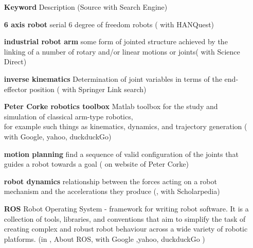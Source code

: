 \begin{itemize} [wide=\parindent]  %
	\item[\textbf{Keyword}] Description (Source with Search Engine)
	\item [\textbf{6 axis robot}] serial 6 degree of freedom robots (\cite{6axisRobot} with HANQuest)
	\item [\textbf{industrial robot arm}]  some form of jointed structure  achieved by the linking of a number of rotary and/or linear motions or \gls{joints}( \cite{IndustrialRobotArm} with Science Direct)
	\item [\textbf{inverse kinematics}] Determination of joint variables in terms of the end-effector position 
	(\cite{Jazar2007} with Springer Link search)
	\item[\textbf{Peter Corke robotics toolbox}] Matlab toolbox for the study and simulation of classical arm-type robotics,\\ for example such things as kinematics, dynamics, and  trajectory generation (\cite{CorkeRoboticsToolbox} with Google, yahoo, duckduckGo)
	\item [\textbf{motion planning}]  find a sequence of valid configuration of the \gls{joints} that  guides a robot towards a goal (\cite{CorkeRoboticVisionControl} on website of Peter Corke)
	\item [\textbf{robot dynamics}] relationship between the forces acting on a robot mechanism and the accelerations they produce (\cite{RobotDynamics}, with Scholarpedia)
	\item [\textbf{ROS}] Robot Operating System - framework for writing robot software. It is a collection of tools, libraries, and conventions that aim to simplify the task of creating complex and robust robot behaviour across a wide variety of robotic platforms. (in \cite{ROS}, About ROS, with Google ,yahoo, duckduckGo ) 
\end{itemize} 
\medskip

